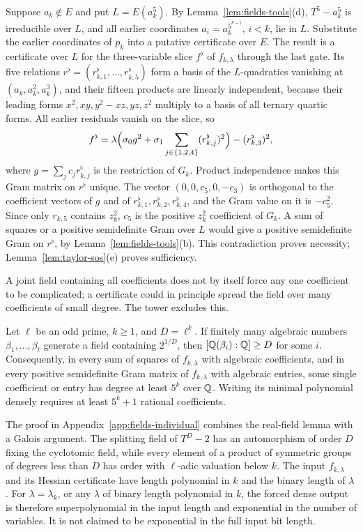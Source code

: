 Suppose $a_k\notin E$ and put $L=E(a_k^5)$. By
Lemma~\ref{lem:fields-tools}(d), $T^5-a_k^5$ is irreducible over $L$, and all
earlier coordinates $a_i=a_k^{5^{k-i}}$, $i<k$, lie in $L$. Substitute the
earlier coordinates of $p_k$ into a putative certificate over $E$. The result
is a certificate over $L$ for the three-variable slice $f^\flat$ of
$f_{k,\lambda}$ through the last gate. Its five relations
$r^\flat=(r^\flat_{k,1},\ldots,r^\flat_{k,5})$ form a basis of the
$L$-quadratics vanishing at $(a_k,a_k^2,a_k^3)$, and their fifteen products
are linearly independent, because their leading forms
$x^2,xy,y^2-xz,yz,z^2$ multiply to a basis of all ternary quartic forms. All
earlier residuals vanish on the slice, so
\[
 f^\flat=\lambda\Bigl(\sigma_0g^2+\sigma_1\sum_{j\in\{1,2,4\}}
   (r^\flat_{k,j})^2\Bigr)-(r^\flat_{k,3})^2,
\]
where $g=\sum_jc_jr^\flat_{k,j}$ is the restriction of $G_k$. Product
independence makes this Gram matrix on $r^\flat$ unique. The vector
$(0,0,c_5,0,-c_3)$ is orthogonal to the coefficient vectors of $g$ and of $r^\flat_{k,1},r^\flat_{k,2},r^\flat_{k,4}$, and the Gram value
on it is $-c_5^2$. Since only $r_{k,5}$ contains $z_k^2$, $c_5$ is the
positive $z_k^2$ coefficient of $G_k$. A sum of squares or a positive
semidefinite Gram over $L$ would give a positive semidefinite Gram on
$r^\flat$, by Lemma~\ref{lem:fields-tools}(b). This contradiction proves
necessity; Lemma~\ref{lem:taylor-sos}(e) proves sufficiency.

A joint field containing all coefficients does not by itself force any one
coefficient to be complicated; a certificate could in principle spread the
field over many coefficients of small degree. The tower excludes this.

\begin{theorem}
\label{thm:fields-individual}
Let $\ell$ be an odd prime, $k\ge1$, and $D=\ell^k$. If finitely many
algebraic numbers $\beta_1,\ldots,\beta_t$ generate a field containing
$2^{1/D}$, then $[\mathbb Q(\beta_i):\mathbb Q]\ge D$ for some $i$. Consequently, in every
sum of squares of $f_{k,\lambda}$ with algebraic coefficients, and in every
positive semidefinite Gram matrix of $f_{k,\lambda}$ with algebraic entries,
some single coefficient or entry has degree at least $5^k$ over $\mathbb Q$. Writing
its minimal polynomial densely requires at least $5^k+1$ rational
coefficients.
\end{theorem}

The proof in Appendix~\ref{app:fields-individual} combines the real-field
lemma with a Galois argument. The splitting field of $T^D-2$ has an
automorphism of order $D$ fixing the cyclotomic field, while every element of
a product of symmetric groups of degrees less than $D$ has order with
$\ell$-adic valuation below $k$. The input $f_{k,\lambda}$ and its Hessian
certificate have length polynomial in $k$ and the binary length of
$\lambda$. For $\lambda=\lambda_k$, or any $\lambda$ of binary length
polynomial in $k$, the forced dense output is therefore superpolynomial in
the input length and exponential in the number of variables. It is not
claimed to be exponential in the full input bit length.

